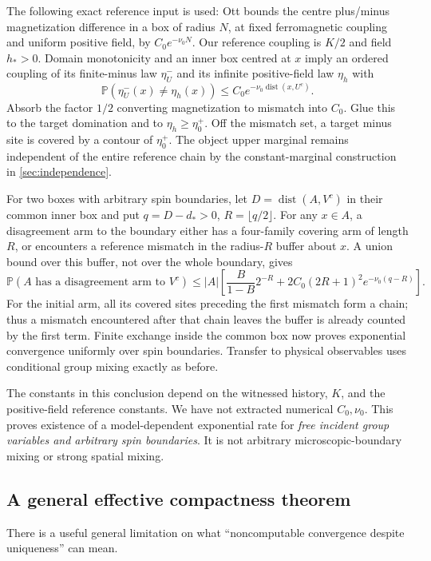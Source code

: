 \documentclass[11pt,reqno]{amsart}
\numberwithin{equation}{section}
\theoremstyle{definition}
\theoremstyle{remark}
\newcommand{\Prob}{\mathbb P}
\newcommand{\dist}{\operatorname{dist}}
\begin{document}
The following exact reference input is used: Ott \cite[Theorem~6.1, arXiv version~2]{Ott2020} bounds the centre plus/minus magnetization difference in a box of radius $N$, at fixed ferromagnetic coupling and uniform positive field, by $C_0e^{-\nu_0N}$. Our reference coupling is $K/2$ and field $h_*>0$. Domain monotonicity and an inner box centred at $x$ imply an ordered coupling of its finite-minus law $\eta_U^-$ and its infinite positive-field law $\eta_h$ with
\begin{equation}\label{eq:ottmismatch}
 \Prob(\eta_U^-(x)\ne\eta_h(x))
 \leq C_0e^{-\nu_0\dist(x,U^c)}.
\end{equation}
Absorb the factor $1/2$ converting magnetization to mismatch into $C_0$. Glue this to the target domination and to $\eta_h\geq\eta_0^+$. Off the mismatch set, a target minus site is covered by a contour of $\eta_0^+$. The object upper marginal remains independent of the entire reference chain by the constant-marginal construction in \cref{sec:independence}.

For two boxes with arbitrary spin boundaries, let $D=\dist(A,V^c)$ in their common inner box and put $q=D-d_*>0$, $R=\lfloor q/2\rfloor$. For any $x\in A$, a disagreement arm to the boundary either has a four-family covering arm of length $R$, or encounters a reference mismatch in the radius-$R$ buffer about $x$. A union bound over this buffer, not over the whole boundary, gives
\begin{equation}\label{eq:arbbound}
 \Prob(A\text{ has a disagreement arm to }V^c)
 \leq |A|\left[\frac B{1-B}2^{-R}
 +2C_0(2R+1)^2e^{-\nu_0(q-R)}\right].
\end{equation}
For the initial arm, all its covered sites preceding the first mismatch form a chain; thus a mismatch encountered after that chain leaves the buffer is already counted by the first term. Finite exchange inside the common box now proves exponential convergence uniformly over spin boundaries. Transfer to physical observables uses conditional group mixing exactly as before.

The constants in this conclusion depend on the witnessed history, $K$, and the positive-field reference constants. We have not extracted numerical $C_0,\nu_0$. This proves existence of a model-dependent exponential rate for \emph{free incident group variables and arbitrary spin boundaries}. It is not arbitrary microscopic-boundary mixing or strong spatial mixing.

\subsection{A general effective compactness theorem}\label{sec:modulus}
There is a useful general limitation on what ``noncomputable convergence despite uniqueness'' can mean.
\end{document}
